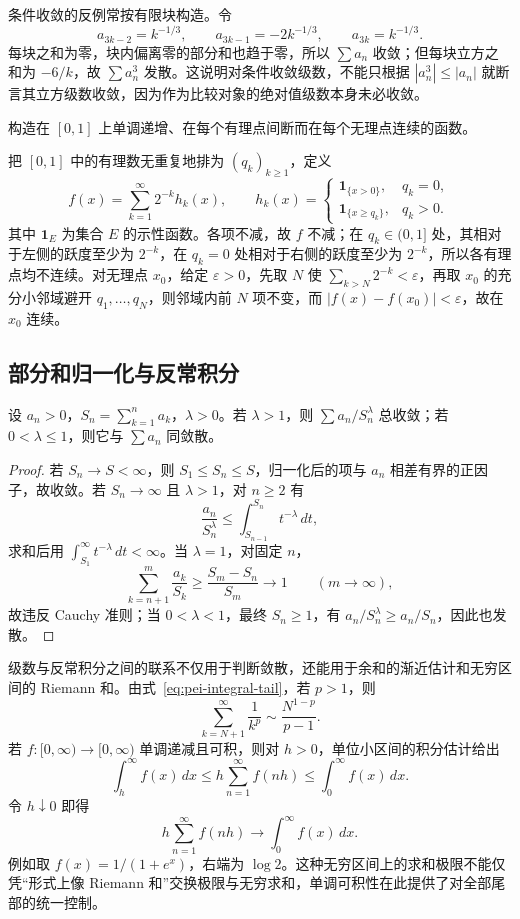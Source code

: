 条件收敛的反例常按有限块构造。令
\[
 a_{3k-2}=k^{-1/3},\qquad
 a_{3k-1}=-2k^{-1/3},\qquad
 a_{3k}=k^{-1/3}.
\]
每块之和为零，块内偏离零的部分和也趋于零，所以 $\sum a_n$ 收敛；但每块立方之和为 $-6/k$，故 $\sum a_n^3$ 发散。这说明对条件收敛级数，不能只根据 $|a_n^3|\leq|a_n|$ 就断言其立方级数收敛，因为作为比较对象的绝对值级数本身未必收敛。

\begin{example}
构造在 $[0,1]$ 上单调递增、在每个有理点间断而在每个无理点连续的函数。
\end{example}
\begin{solve}
把 $[0,1]$ 中的有理数无重复地排为 $(q_k)_{k\geq1}$，定义
\[
 f(x)=\sum_{k=1}^{\infty}2^{-k}h_k(x),\qquad
 h_k(x)=
 \begin{cases}
  \mathbf1_{\{x>0\}},&q_k=0,\\
  \mathbf1_{\{x\geq q_k\}},&q_k>0.
 \end{cases}
\]
其中 $\mathbf1_E$ 为集合 $E$ 的示性函数。各项不减，故 $f$ 不减；在 $q_k\in(0,1]$ 处，其相对于左侧的跃度至少为 $2^{-k}$，在 $q_k=0$ 处相对于右侧的跃度至少为 $2^{-k}$，所以各有理点均不连续。对无理点 $x_0$，给定 $\varepsilon>0$，先取 $N$ 使 $\sum_{k>N}2^{-k}<\varepsilon$，再取 $x_0$ 的充分小邻域避开 $q_1,\ldots,q_N$，则邻域内前 $N$ 项不变，而 $|f(x)-f(x_0)|<\varepsilon$，故在 $x_0$ 连续。
\end{solve}

\subsection{部分和归一化与反常积分}

\begin{proposition}
设 $a_n>0$，$S_n=\sum_{k=1}^{n}a_k$，$\lambda>0$。若 $\lambda>1$，则 $\sum a_n/S_n^\lambda$ 总收敛；若 $0<\lambda\leq1$，则它与 $\sum a_n$ 同敛散。
\end{proposition}
\begin{proof}
若 $S_n\to S<\infty$，则 $S_1\leq S_n\leq S$，归一化后的项与 $a_n$ 相差有界的正因子，故收敛。若 $S_n\to\infty$ 且 $\lambda>1$，对 $n\geq2$ 有
\[
 \frac{a_n}{S_n^\lambda}\leq
 \int_{S_{n-1}}^{S_n}t^{-\lambda}\,dt,
\]
求和后用 $\int_{S_1}^{\infty}t^{-\lambda}\,dt<\infty$。当 $\lambda=1$，对固定 $n$，
\[
 \sum_{k=n+1}^{m}\frac{a_k}{S_k}
 \geq\frac{S_m-S_n}{S_m}\longrightarrow1\qquad(m\to\infty),
\]
故违反 Cauchy 准则；当 $0<\lambda<1$，最终 $S_n\geq1$，有 $a_n/S_n^\lambda\geq a_n/S_n$，因此也发散。
\end{proof}

级数与反常积分之间的联系不仅用于判断敛散，还能用于余和的渐近估计和无穷区间的 Riemann 和。由式~\eqref{eq:pei-integral-tail}，若 $p>1$，则
\[
 \sum_{k=N+1}^{\infty}\frac1{k^p}
 \sim\frac{N^{1-p}}{p-1}.
\]
若 $f:[0,\infty)\to[0,\infty)$ 单调递减且可积，则对 $h>0$，单位小区间的积分估计给出
\[
 \int_h^{\infty}f(x)\,dx
 \leq h\sum_{n=1}^{\infty}f(nh)
 \leq\int_0^{\infty}f(x)\,dx.
\]
令 $h\downarrow0$ 即得
\begin{equation}
 h\sum_{n=1}^{\infty}f(nh)\longrightarrow\int_0^{\infty}f(x)\,dx.
 \label{eq:pei-infinite-riemann}
\end{equation}
例如取 $f(x)=1/(1+e^x)$，右端为 $\log2$。这种无穷区间上的求和极限不能仅凭“形式上像 Riemann 和”交换极限与无穷求和，单调可积性在此提供了对全部尾部的统一控制。

